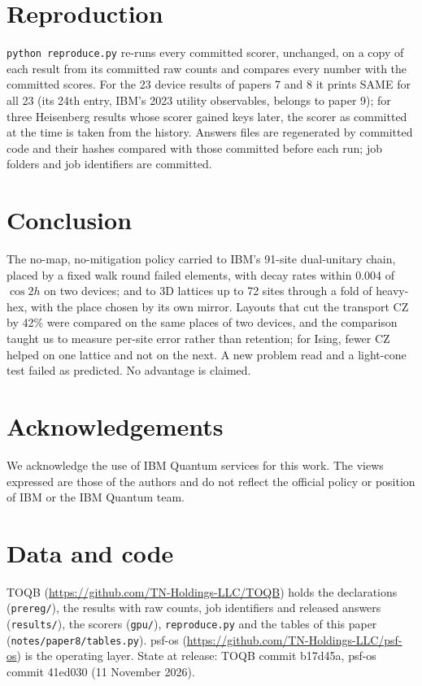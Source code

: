 \documentclass[10pt,a4paper]{article}
\begin{document}
\section{Reproduction}\label{sec:repro}
\texttt{python reproduce.py} re-runs every committed scorer, unchanged, on a copy of each result from its committed
raw counts and compares every number with the committed scores. For the 23 device results of papers 7 and 8 it prints
SAME for all 23 (its 24th entry, IBM's 2023 utility observables, belongs to paper 9); for three Heisenberg results whose scorer gained keys later, the scorer as committed at the time is
taken from the history. Answers files are regenerated by committed code and their hashes compared with those
committed before each run; job folders and job identifiers are committed.

\section{Conclusion}
The no-map, no-mitigation policy carried to IBM's 91-site dual-unitary chain, placed by a fixed walk round failed
elements, with decay rates within 0.004 of $\cos 2h$ on two devices; and to 3D lattices up to 72 sites through a fold of heavy-hex,
with the place chosen by its own mirror. Layouts that cut the transport CZ by 42\% were compared on the same places of
two devices, and the comparison taught us to measure per-site error rather than retention; for Ising, fewer CZ helped
on one lattice and not on the next. A new problem read and a light-cone test failed as predicted. No advantage is claimed.

\section*{Acknowledgements}
We acknowledge the use of IBM Quantum services for this work. The views expressed are those of the authors and do not
reflect the official policy or position of IBM or the IBM Quantum team.

\section*{Data and code}
TOQB (\url{https://github.com/TN-Holdings-LLC/TOQB}) holds the declarations (\texttt{prereg/}), the results with raw
counts, job identifiers and released answers (\texttt{results/}), the scorers (\texttt{gpu/}), \texttt{reproduce.py}
and the tables of this paper (\texttt{notes/paper8/tables.py}). psf-os (\url{https://github.com/TN-Holdings-LLC/psf-os})
is the operating layer. State at release: TOQB commit b17d45a, psf-os commit 41ed030 (11 November 2026).
\end{document}
